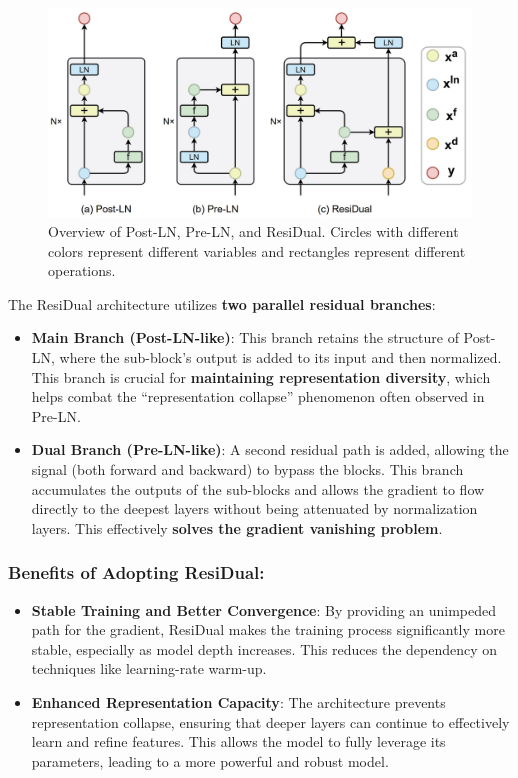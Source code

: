 \begin{figure}[H]
    \centering
    \includegraphics[width=1\linewidth]{image/residual.jpg}
    \caption{Overview of Post-LN, Pre-LN, and ResiDual. Circles with different colors represent different variables and rectangles represent different operations.}
    \label{fig:residual}
\end{figure}

The ResiDual architecture utilizes \textbf{two parallel residual branches}:

\begin{itemize}[nosep]
    \item \textbf{Main Branch (Post-LN-like)}: This branch retains the structure of Post-LN, where the sub-block's output is added to its input and then normalized. This branch is crucial for \textbf{maintaining representation diversity}, which helps combat the ``representation collapse'' phenomenon often observed in Pre-LN.
    
    \item \textbf{Dual Branch (Pre-LN-like)}: A second residual path is added, allowing the signal (both forward and backward) to bypass the blocks. This branch accumulates the outputs of the sub-blocks and allows the gradient to flow directly to the deepest layers without being attenuated by normalization layers. This effectively \textbf{solves the gradient vanishing problem}.
\end{itemize}

\subsubsection*{Benefits of Adopting ResiDual:}

\begin{itemize}[nosep]
    \item \textbf{Stable Training and Better Convergence}: By providing an unimpeded path for the gradient, ResiDual makes the training process significantly more stable, especially as model depth increases. This reduces the dependency on techniques like learning-rate warm-up.

    \item \textbf{Enhanced Representation Capacity}: The architecture prevents representation collapse, ensuring that deeper layers can continue to effectively learn and refine features. This allows the model to fully leverage its parameters, leading to a more powerful and robust model.
\end{itemize}